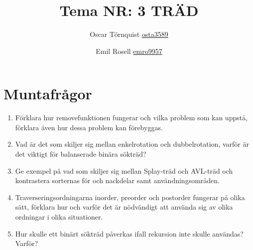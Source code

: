 \documentclass[a5paper,10pt,oneside]{article}
\title{Tema NR: 3 TRÄD}
\author{Oscar Törnquist \url{osta3589} \and Emil Rosell \url{emro9957}}
\begin{document}
\maketitle


\section*{Muntafrågor}
\begin{enumerate}
\item Förklara hur removefunktionen fungerar och vilka problem som kan uppstå, förklara även hur dessa problem kan förebyggas.
\item Vad är det som skiljer sig mellan enkelrotation och dubbelrotation, varför är det viktigt för balanserade binära sökträd?
\item Ge exempel på vad som skiljer sig mellan Splay-träd och AVL-träd och kontrastera sorternas för och nackdelar samt användningsområden.
\item Traverseringsordningarna inorder, preorder och postorder fungerar på olika sätt, förklara hur och varför det är nödvändigt att använda sig av olika ordningar i olika situationer.
\item Hur skulle ett binärt sökträd påverkas ifall rekursion inte skulle användas? Varför?

\end{enumerate}
\end{document}
